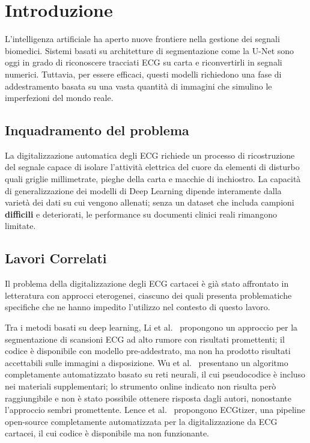 \chapter{Introduzione}

L'intelligenza artificiale ha aperto nuove frontiere nella gestione dei segnali biomedici. Sistemi basati su architetture di segmentazione come la U-Net sono oggi in grado di riconoscere tracciati ECG su carta e riconvertirli in segnali numerici. Tuttavia, per essere efficaci, questi modelli richiedono una fase di addestramento basata su una vasta quantità di immagini che simulino le imperfezioni del mondo reale.

\section{Inquadramento del problema}
La digitalizzazione automatica degli ECG richiede un processo di ricostruzione del segnale capace di isolare l'attività elettrica del cuore da elementi di disturbo quali griglie millimetrate, pieghe della carta e macchie di inchiostro. La capacità di generalizzazione dei modelli di Deep Learning dipende interamente dalla varietà dei dati su cui vengono allenati; senza un dataset che includa campioni \textbf{difficili} e deteriorati, le performance su documenti clinici reali rimangono limitate.

\section{Lavori Correlati}
Il problema della digitalizzazione degli ECG cartacei è già stato affrontato in letteratura con approcci eterogenei, ciascuno dei quali presenta problematiche specifiche che ne hanno impedito l'utilizzo nel contesto di questo lavoro.

Tra i metodi basati su deep learning, Li et al.~\cite{li2020deep} propongono un approccio per la segmentazione di scansioni ECG ad alto rumore con risultati promettenti; il codice è disponibile con modello pre-addestrato, ma non ha prodotto risultati accettabili sulle immagini a disposizione. Wu et al.~\cite{wu2022} presentano un algoritmo completamente automatizzato basato su reti neurali, il cui pseudocodice è incluso nei materiali supplementari; lo strumento online indicato non risulta però raggiungibile e non è stato possibile ottenere risposta dagli autori, nonostante l'approccio sembri promettente. Lence et al.~\cite{lence2026} propongono ECGtizer, una pipeline open-source completamente automatizzata per la digitalizzazione da ECG cartacei, il cui codice è disponibile ma non funzionante.


